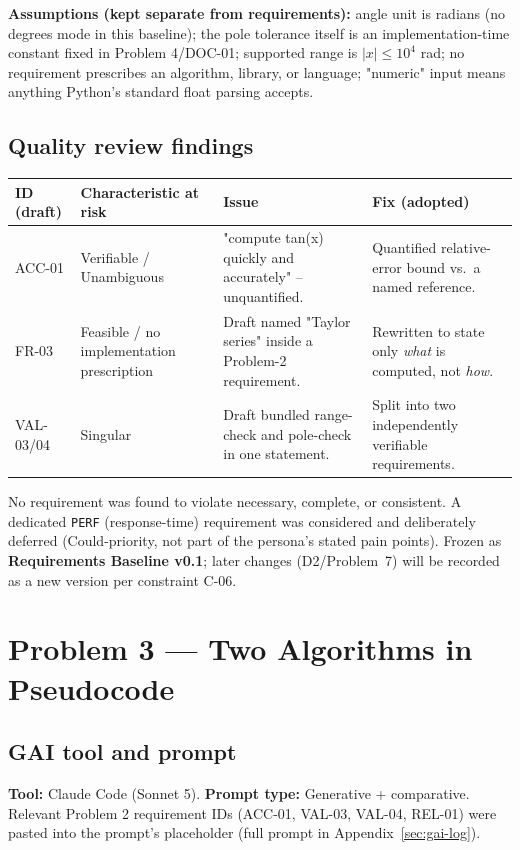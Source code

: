 \documentclass[11pt]{article}
\begin{document}
\textbf{Assumptions (kept separate from requirements):} angle unit is radians (no degrees mode in this baseline); the pole tolerance itself is an implementation-time constant fixed in Problem 4/DOC-01; supported range is $|x|\le 10^4$ rad; no requirement prescribes an algorithm, library, or language; "numeric" input means anything Python's standard float parsing accepts.

\subsection{Quality review findings}

\begin{longtable}{L{1.6cm}L{3.3cm}L{5.3cm}L{5cm}}
\toprule
\textbf{ID (draft)} & \textbf{Characteristic at risk} & \textbf{Issue} & \textbf{Fix (adopted)} \\
\midrule
\endhead
ACC-01 & Verifiable / Unambiguous & "compute tan(x) quickly and accurately" -- unquantified. & Quantified relative-error bound vs.\ a named reference. \\
FR-03 & Feasible / no implementation prescription & Draft named "Taylor series" inside a Problem-2 requirement. & Rewritten to state only \emph{what} is computed, not \emph{how}. \\
VAL-03/04 & Singular & Draft bundled range-check and pole-check in one statement. & Split into two independently verifiable requirements. \\
\bottomrule
\end{longtable}

No requirement was found to violate necessary, complete, or consistent. A dedicated \texttt{PERF} (response-time) requirement was considered and deliberately deferred (Could-priority, not part of the persona's stated pain points). Frozen as \textbf{Requirements Baseline v0.1}; later changes (D2/Problem~7) will be recorded as a new version per constraint C-06.

\section{Problem 3 --- Two Algorithms in Pseudocode}

\subsection{GAI tool and prompt}
\textbf{Tool:} Claude Code (Sonnet 5). \textbf{Prompt type:} Generative + comparative. Relevant Problem 2 requirement IDs (ACC-01, VAL-03, VAL-04, REL-01) were pasted into the prompt's placeholder (full prompt in Appendix~\ref{sec:gai-log}).
\end{document}

